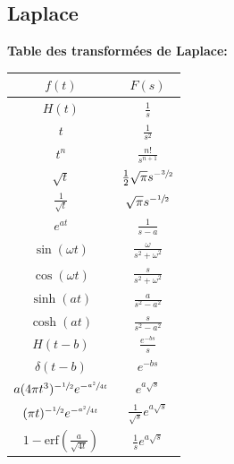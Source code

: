 \subsection*{Laplace}
\textbf{Table des transformées de Laplace:}
\begin{center}
    \renewcommand{\arraystretch}{1.25}
    \begin{tabular}{cc}
        \toprule
        $f(t)$                                            & $F(s)$                                   \\
        \midrule
        $H(t)$                                            & $\frac{1}{s}$                            \\
        $t$                                               & $\frac{1}{s^2}$                          \\
        $t^n$                                             & $\frac{n!}{s^{n+1}}$                     \\
        $\sqrt{t}$                                        & $\frac{1}{2}\sqrt{\pi}s^{-\sfrac{3}{2}}$ \\
        $\frac{1}{\sqrt{t}}$                              & $\sqrt{\pi}s^{-\sfrac{1}{2}}$            \\
        $e^{at}$                                          & $\frac{1}{s-a}$                          \\
        $\sin(\omega t)$                                  & $\frac{\omega}{s^2+\omega^2}$            \\
        $\cos(\omega t)$                                  & $\frac{s}{s^2+\omega^2}$                 \\
        $\sinh(at)$                                       & $\frac{a}{s^2-a^2}$                      \\
        $\cosh(at)$                                       & $\frac{s}{s^2-a^2}$                      \\
        $H(t-b)$                                          & $\frac{e^{-bs}}{s}$                      \\
        $\delta(t-b)$                                     & $e^{-bs}$                                \\
        $a(4\pi t^3)^{-\sfrac{1}{2}}e^{-\sfrac{a^2}{4t}}$ & $e^{a\sqrt{s}}$                          \\
        $(\pi t)^{-\sfrac{1}{2}}e^{-\sfrac{a^2}{4t}}$     & $\frac{1}{\sqrt{s}}e^{a\sqrt{s}}$        \\
        $1-\text{erf}\left(\frac{a}{\sqrt{4t}}\right)$    & $\frac{1}{s}e^{a\sqrt{s}}$               \\
        \bottomrule
    \end{tabular}
\end{center}

